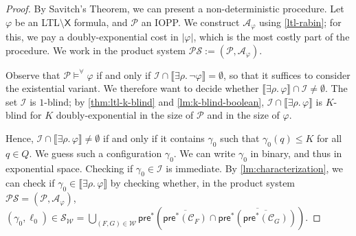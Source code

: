 \documentclass[10pt,a4paper]{article}
\renewcommand{\le}{\leqslant}
\newcommand{\deff}{:=}
\newcommand{\size}[1]{|#1|}
\newcommand{\prot}{\mathcal{P}}
\newcommand{\config}{\gamma}
\newcommand{\initialconfigs}{\mathcal{I}}
\newcommand{\preop}{\mathsf{pre}}
\newcommand{\prestar}[1]{\preop^*(#1)}
\newcommand{\run}{\rho}
\newcommand*{\states}{Q}
\newcommand{\satset}[1]{\llbracket {#1} \rrbracket}
\newcommand{\PP}{\mathcal{P}}                  %
\newcommand{\initial}{\mathcal{I}}   %
\newcommand{\cSet}{\mathcal{S}}  %
\newcommand*{\buchiaut}{\mathcal{A}}
\newcommand*{\ltlaut}[1]{\buchiaut_{#1}}
\newcommand*{\abuchistate}{\ell}
\newcommand*{\bstate}{\abuchistate}
\newcommand*{\binitstate}{\bstate_0}
\newcommand*{\bwinning}{\mathcal{W}}
\newcommand{\prodsystem}{\mathcal{PS}}
\newcommand{\prodconfigs}{\mathcal{C}}
\newcommand{\prodconfigsproj}[1]{\prodconfigs_{#1}}
\newcommand*{\setcomplement}[1]{\overline{#1}}
\newcommand{\ltlnext}{\mathsf{X}}
\newcommand{\modelsforall}{\models^{\forall}}
\newcommand{\ltlgre}{\cSet_\bwinning}
\begin{document}
\begin{proof}
	By Savitch's Theorem, we can present a non-deterministic procedure.
	Let \(\varphi\) be an LTL\(\setminus \ltlnext\) formula, and \(\PP\) an IOPP.
	We construct \(\ltlaut{\varphi}\) using \cref{ltl-rabin}; for this, we pay a doubly-exponential cost in \(\size{\varphi}\), which is the most costly part of the procedure.
	We work in the product system \(\prodsystem \deff (\prot, \ltlaut{\varphi})\).

	Observe that \(\PP \modelsforall \varphi\) if and only if \(\initialconfigs \cap \satset{\exists \run .
		\, \neg \varphi} = \emptyset\), so that it suffices to consider the existential variant.
	We therefore want to decide whether \linebreak \(\satset{\exists \run.
		\,\varphi} \cap \initialconfigs \ne \emptyset\).
	The set \(\initialconfigs\) is \(1\)-blind; by \cref{thm:ltl-k-blind} and \cref{lm:k-blind-boolean}, \(\initialconfigs \cap \satset{\exists \run .
		\, \varphi}\) is \(K\)-blind for \(K\) doubly-exponential in the size of \(\prot\) and in the size of \(\varphi\).

	Hence, \(\initial \cap \satset{\exists \run .
		\, \varphi} \ne \emptyset\) if and only if it contains \(\config_0\) such that
	\(\config_0(q) \le K\) for all \(q \in \states\).
	We guess such a configuration \(\config_0\).
	We can write \(\config_0\) in binary, and thus in exponential space.
	Checking if \(\config_0 \in \initial\) is immediate.
	By \cref{lm:characterization}, we can check if \(\config_0 \in \satset{\exists \run .
		\, \varphi}\) by checking whether, in the product system \(\prodsystem = (\prot, \ltlaut{\varphi})\), \linebreak
	\((\config_0, \binitstate) \in \ltlgre = \bigcup_{(F, G) \in \bwinning} \preop^* \left(
	\setcomplement{\prestar{\prodconfigsproj{F}}} \cap \setcomplement{\prestar{\setcomplement{\prestar{\prodconfigsproj{G}}}}} \right)\).


\end{proof}
\end{document}
